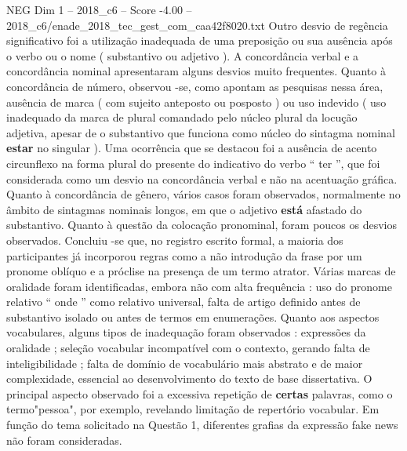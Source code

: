 \begin{textsample}{NEG Dim 1 – 2018\_c6 – Score -4.00 – 2018\_c6/enade\_2018\_tec\_gest\_com\_caa42f8020.txt}
Outro desvio de regência significativo foi a utilização inadequada de uma preposição ou sua ausência após o verbo ou o nome ( substantivo ou adjetivo ).
A concordância verbal e a concordância nominal apresentaram alguns desvios muito frequentes.
Quanto à concordância de número, observou -se, como apontam as pesquisas nessa área, ausência de marca ( com sujeito anteposto ou posposto ) ou uso indevido ( uso inadequado da marca de plural comandado pelo núcleo plural da locução adjetiva, apesar de o substantivo que funciona como núcleo do sintagma nominal \textbf{estar} no singular ).
Uma ocorrência que se destacou foi a ausência de acento circunflexo na forma plural do presente do indicativo do verbo “ ter ”, que foi considerada como um desvio na concordância verbal e não na acentuação gráfica.
Quanto à concordância de gênero, vários casos foram observados, normalmente no âmbito de sintagmas nominais longos, em que o adjetivo \textbf{está} afastado do substantivo.
Quanto à questão da colocação pronominal, foram poucos os desvios observados.
Concluiu -se que, no registro escrito formal, a maioria dos participantes já incorporou regras como a não introdução da frase por um pronome oblíquo e a próclise na presença de um termo atrator.
Várias marcas de oralidade foram identificadas, embora não com alta frequência : uso do pronome relativo “ onde ” como relativo universal, falta de artigo definido antes de substantivo isolado ou antes de termos em enumerações.
Quanto aos aspectos vocabulares, alguns tipos de inadequação foram observados : expressões da oralidade ; seleção vocabular incompatível com o contexto, gerando falta de inteligibilidade ; falta de domínio de vocabulário mais abstrato e de maior complexidade, essencial ao desenvolvimento do texto de base dissertativa.
O principal aspecto observado foi a excessiva repetição de \textbf{certas} palavras, como o termo"pessoa", por exemplo, revelando limitação de repertório vocabular.
Em função do tema solicitado na Questão 1, diferentes grafias da expressão fake news não foram consideradas.

\end{textsample}
